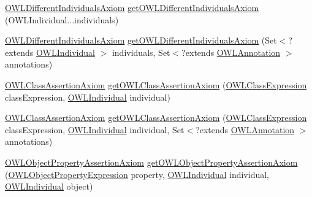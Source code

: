 \begin{DoxyCompactItemize}
\hyperlink{interfaceorg_1_1semanticweb_1_1owlapi_1_1model_1_1_o_w_l_different_individuals_axiom}{O\-W\-L\-Different\-Individuals\-Axiom} \hyperlink{interfaceorg_1_1semanticweb_1_1owlapi_1_1model_1_1_o_w_l_data_factory_aeef524ba64469d137e63dca86c583fb2}{get\-O\-W\-L\-Different\-Individuals\-Axiom} (O\-W\-L\-Individual...\-individuals)
\item 
\hyperlink{interfaceorg_1_1semanticweb_1_1owlapi_1_1model_1_1_o_w_l_different_individuals_axiom}{O\-W\-L\-Different\-Individuals\-Axiom} \hyperlink{interfaceorg_1_1semanticweb_1_1owlapi_1_1model_1_1_o_w_l_data_factory_a436c718baddb218f4f3227de71bf9989}{get\-O\-W\-L\-Different\-Individuals\-Axiom} (Set$<$?extends \hyperlink{interfaceorg_1_1semanticweb_1_1owlapi_1_1model_1_1_o_w_l_individual}{O\-W\-L\-Individual} $>$ individuals, Set$<$?extends \hyperlink{interfaceorg_1_1semanticweb_1_1owlapi_1_1model_1_1_o_w_l_annotation}{O\-W\-L\-Annotation} $>$ annotations)
\item 
\hyperlink{interfaceorg_1_1semanticweb_1_1owlapi_1_1model_1_1_o_w_l_class_assertion_axiom}{O\-W\-L\-Class\-Assertion\-Axiom} \hyperlink{interfaceorg_1_1semanticweb_1_1owlapi_1_1model_1_1_o_w_l_data_factory_a6c9dfb88282547f12a3ca9a8d7b147ae}{get\-O\-W\-L\-Class\-Assertion\-Axiom} (\hyperlink{interfaceorg_1_1semanticweb_1_1owlapi_1_1model_1_1_o_w_l_class_expression}{O\-W\-L\-Class\-Expression} class\-Expression, \hyperlink{interfaceorg_1_1semanticweb_1_1owlapi_1_1model_1_1_o_w_l_individual}{O\-W\-L\-Individual} individual)
\item 
\hyperlink{interfaceorg_1_1semanticweb_1_1owlapi_1_1model_1_1_o_w_l_class_assertion_axiom}{O\-W\-L\-Class\-Assertion\-Axiom} \hyperlink{interfaceorg_1_1semanticweb_1_1owlapi_1_1model_1_1_o_w_l_data_factory_af9eca3bbeb007d377258ab643c56fccb}{get\-O\-W\-L\-Class\-Assertion\-Axiom} (\hyperlink{interfaceorg_1_1semanticweb_1_1owlapi_1_1model_1_1_o_w_l_class_expression}{O\-W\-L\-Class\-Expression} class\-Expression, \hyperlink{interfaceorg_1_1semanticweb_1_1owlapi_1_1model_1_1_o_w_l_individual}{O\-W\-L\-Individual} individual, Set$<$?extends \hyperlink{interfaceorg_1_1semanticweb_1_1owlapi_1_1model_1_1_o_w_l_annotation}{O\-W\-L\-Annotation} $>$ annotations)
\item 
\hyperlink{interfaceorg_1_1semanticweb_1_1owlapi_1_1model_1_1_o_w_l_object_property_assertion_axiom}{O\-W\-L\-Object\-Property\-Assertion\-Axiom} \hyperlink{interfaceorg_1_1semanticweb_1_1owlapi_1_1model_1_1_o_w_l_data_factory_abaf41e00962bc47185fde7cb50fc286c}{get\-O\-W\-L\-Object\-Property\-Assertion\-Axiom} (\hyperlink{interfaceorg_1_1semanticweb_1_1owlapi_1_1model_1_1_o_w_l_object_property_expression}{O\-W\-L\-Object\-Property\-Expression} property, \hyperlink{interfaceorg_1_1semanticweb_1_1owlapi_1_1model_1_1_o_w_l_individual}{O\-W\-L\-Individual} individual, \hyperlink{interfaceorg_1_1semanticweb_1_1owlapi_1_1model_1_1_o_w_l_individual}{O\-W\-L\-Individual} object)

\end{DoxyCompactItemize}

